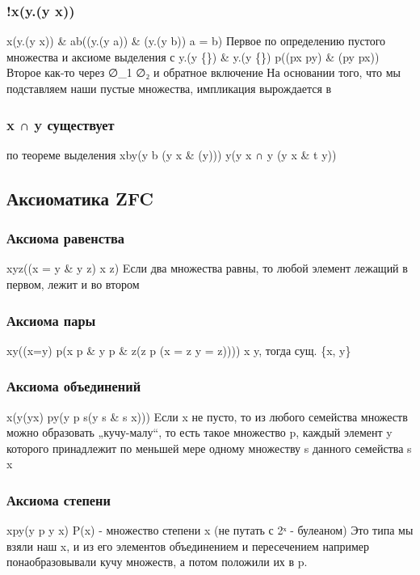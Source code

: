 \subsubsection{\exists !x(\forall y.\lnot (y \in x))}
\label{sec-15-1-3}
\exists x(\forall y.\lnot (y \in x)) \& \forall a\forall b((\forall y.\lnot (y \in a)) \& (\forall y.\lnot (y \in b)) \to a = b)
Первое по определению пустого множества и аксиоме выделения с \bot
\forall y.(\lnot y \in \{\}) \& \forall y.(\lnot y \in \{\}) \to \forall p((p\in x \to p\in y) \& (p\in y \to p\in x))
Второе как-то через ∅_1 \in ∅₂ и обратное включение
На основании того, что мы подставляем наши пустые множества, импликация
вырождается в \top \to \top
\subsubsection{x ∩ y существует}
\label{sec-15-1-4}
по теореме выделения
\forall x\exists b\forall y(y \in b \leftrightarrow (y \in x \& \phi(y)))
\forall y(y \in x ∩ y \leftrightarrow (y \in x \& t \in y))
\subsection{Аксиоматика ZFC}
\label{sec-15-2}
\subsubsection{Аксиома равенства}
\label{sec-15-2-1}
\forall x\forall y\forall z((x = y \& y \in z) \to x \in z)
Eсли два множества равны, то любой элемент лежащий в первом,
лежит и во втором
\subsubsection{Аксиома пары}
\label{sec-15-2-2}
\forall x\forall y(\lnot (x=y) \to \exists p(x \in p \& y \in p \& \forall z(z \in p \to (x = z \lor y = z))))
x \ne  y, тогда сущ. \{x, y\}
\subsubsection{Аксиома объединений}
\label{sec-15-2-3}
\forall x(\exists y(y\in x) \to \exists p\forall y(y \in p \leftrightarrow \exists s(y \in s \& s \in x)))
Eсли x не пусто, то из любого семейства множеств можно
образовать „кучу-малу“, то есть такое множество p,
каждый элемент y которого принадлежит по меньшей мере
одному множеству s данного семейства s x
\subsubsection{Аксиома степени}
\label{sec-15-2-4}
\forall x\exists p\forall y(y \in p \leftrightarrow y \in x)
P(x) - множество степени x (не путать с 2ˣ - булеаном)
Это типа мы взяли наш x, и из его элементов объединением и
пересечением например понаобразовывали кучу множеств, а потом
положили их в p.
